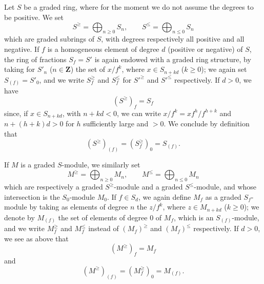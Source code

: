 \begin{env}[8.2.1]
\label{II.8.2.1}
Let $S$ be a graded ring, where for the moment we do not assume the degrees
to be positive. We set
\begin{equation}
\label{II.8.2.1.1}
  S^{\geq}=\bigoplus_{n\geq0}S_n,
  \qquad
  S^{\leq}=\bigoplus_{n\leq0}S_n
\tag{8.2.1.1}
\end{equation}
which are graded subrings of $S$, with degrees respectively all
positive and all negative. If $f$ is a homogeneous element of degree $d$
(positive or negative) of $S$, the ring of fractions $S_f=S'$ is again endowed
with a graded ring structure, by taking for $S'_n$ ($n\in\mathbf{Z}$)
the set of $x/f^k$, where $x\in S_{n+kd}$ ($k\geq0$); we again set
$S_{(f)}=S'_0$, and we write $S_f^{\geq}$ and $S_f^{\leq}$ for $S'^{\geq}$ and
$S'^{\leq}$ respectively. If $d>0$, we have
\begin{equation}
\label{II.8.2.1.2}
  (S^{\geq})_f=S_f
\tag{8.2.1.2}
\end{equation}
since, if $x\in S_{n+kd}$, with $n+kd<0$, we can write
$x/f^k=xf^h/f^{h+k}$ and $n+(h+k)d>0$ for $h$ sufficiently large and $>0$. We
conclude by definition that
\begin{equation}
\label{II.8.2.1.3}
  (S^{\geq})_{(f)}=(S_f^{\geq})_0=S_{(f)}.
\tag{8.2.1.3}
\end{equation}

If $M$ is a graded $S$-module, we similarly set
\begin{equation}
\label{II.8.2.1.4}
  M^{\geq}=\bigoplus_{n\geq0}M_n,
  \qquad
  M^{\leq}=\bigoplus_{n\leq0}M_n
\tag{8.2.1.4}
\end{equation}
which are respectively a graded $S^{\geq}$-module and a graded
$S^{\leq}$-module, and whose intersection is the $S_0$-module $M_0$. If $f\in S_d$, we
again define $M_f$ as a graded $S_f$-module by taking as elements of
degree $n$ the $z/f^k$, where $z\in M_{n+kd}$ ($k\geq0$); we denote by
$M_{(f)}$ the set of elements of degree $0$ of $M_f$, which is an
$S_{(f)}$-module, and we write $M_f^{\geq}$ and $M_f^{\leq}$ instead of
$(M_f)^{\geq}$ and $(M_f)^{\leq}$ respectively. If $d>0$, we see as
above that
\begin{equation}
\label{II.8.2.1.5}
  (M^{\geq})_f=M_f
\tag{8.2.1.5}
\end{equation}
and
\begin{equation}
\label{II.8.2.1.6}
  (M^{\geq})_{(f)}=(M_f^{\geq})_0=M_{(f)}.
\tag{8.2.1.6}
\end{equation}
\end{env}

